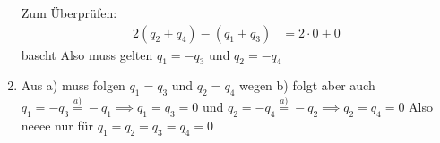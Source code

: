 \documentclass[sectionformat=aufgabe]{gadsescript}
\begin{document}
\begin{enumerate}[label=\alph*)]
		Zum Überprüfen:
		\begin{align*}
			2 (q_2 + q_4) - (q_1 + q_3) &= 2 \cdot 0 + 0
		\end{align*}
		bascht
		Also muss gelten $ q_1 = -q_3 $ und $ q_2 = -q_4 $

	\item Aus a) muss folgen $ q_1 = q_3 $ und $ q_2 = q_4 $ wegen b) folgt aber auch $ q_1 = -q_3 \overset{a)}{=} -q_1 \implies q_1 = q_3 = 0 $ und $ q_2 = -q_4 \overset{a)}{=} -q_2 \implies q_2 = q_4 = 0 $
		Also neeee nur für $ q_1 = q_2 = q_3 = q_4 = 0 $

\end{enumerate}
\end{document}
